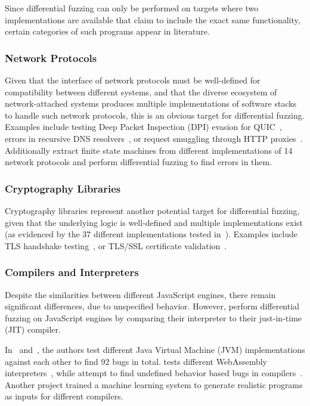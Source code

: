 \documentclass{article}
\let\savedCite=\cite
\renewcommand{\cite}{\unskip~\savedCite}
\begin{document}
\begin{multicols}{2}
    Since differential fuzzing can only be performed on targets where two implementations are available that claim to include the exact same functionality, certain categories of such programs appear in literature.

    \subsubsection{Network Protocols}

    Given that the interface of network protocols must be well-defined for compatibility between different systems, and that the diverse ecosystem of network-attached systems produces multiple implementations of software stacks to handle such network protocols, this is an obvious target for differential fuzzing. Examples include testing Deep Packet Inspection (DPI) evasion for QUIC\cite{DPIFuzz}, errors in recursive DNS resolvers\cite{ResolFuzz}, or request smuggling through HTTP proxies\cite{T-Reqs}. Additionally \citeauthor{ParDiff} extract finite state machines from different implementations of 14 network protocols and perform differential fuzzing to find errors in them.\cite{ParDiff}

    \subsubsection{Cryptography Libraries}

    Cryptography libraries represent another potential target for differential fuzzing, given that the underlying logic is well-defined and multiple implementations exist (as evidenced by the 37 different implementations tested in\cite{TLS}). Examples include TLS handshake testing\cite{ExploitingDissent, TLS}, or TLS/SSL certificate validation\cite{NEZHA}.

    \subsubsection{Compilers and Interpreters}

    Despite the similarities between different JavaScript engines, there remain significant differences, due to unspecified behavior. However, \citeauthor{JIT-Picking} perform differential fuzzing on JavaScript engines by comparing their interpreter to their just-in-time (JIT) compiler.\cite{JIT-Picking}

    In\cite{JVM} and\cite{JVM2}, the authors test different Java Virtual Machine (JVM) implementations against each other to find 92 bugs in total. \citeauthor{WASM} tests different WebAssembly interpreters\cite{WASM}, while \citeauthor{UndefinedBehavior} attempt to find undefined behavior based bugs in compilers\cite{UndefinedBehavior}. Another project trained a machine learning system to generate realistic programs as inputs for different compilers.\cite{CompilerDL}


\end{multicols}
\end{document}
